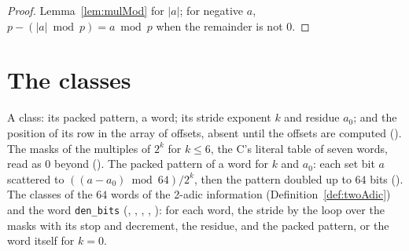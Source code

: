 \begin{proof}
  \leanok
  Lemma~\ref{lem:mulMod} for $|a|$; for negative $a$, $p - (|a| \bmod p) = a \bmod p$ when the
  remainder is not $0$.
\end{proof}

\section{The classes}\label{sec:classes}

\begin{definition}\label{def:numClasses}
  \leanok
  A class: its packed pattern, a word; its stride exponent $k$ and residue $a_0$; and the position
  of its row in the array of offsets, absent until the offsets are computed
  (). The masks of the multiples of $2^k$ for $k \le 6$, the C's
  literal table of seven words, read as $0$ beyond (). The packed
  pattern of a word for $k$ and $a_0$: each set bit $a$ scattered to $((a - a_0) \bmod 64) / 2^k$,
  then the pattern doubled up to $64$ bits (). The classes of the
  $64$ words of the 2-adic information (Definition~\ref{def:twoAdic}) and the word \verb|den_bits|
  (, ,
  , ,
  ): for each word, the stride by the loop over the masks with
  its stop and decrement, the residue, and the packed pattern, or the word itself for $k = 0$.
\end{definition}

